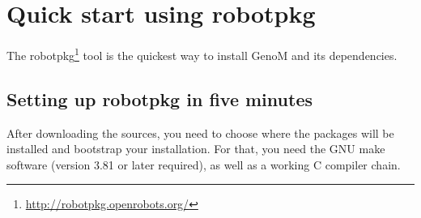 %
%
%
%
%
%


\section{Quick start using robotpkg}

The robotpkg\footnote{\url{http://robotpkg.openrobots.org/}} tool is
the quickest way to install GenoM and its dependencies. 

\subsection{Setting up robotpkg in five minutes}


After downloading the sources, you need to choose where the packages
will be installed and bootstrap your installation. For that, you need
the GNU make software (version 3.81 or later required), as well as a
working C compiler chain.

